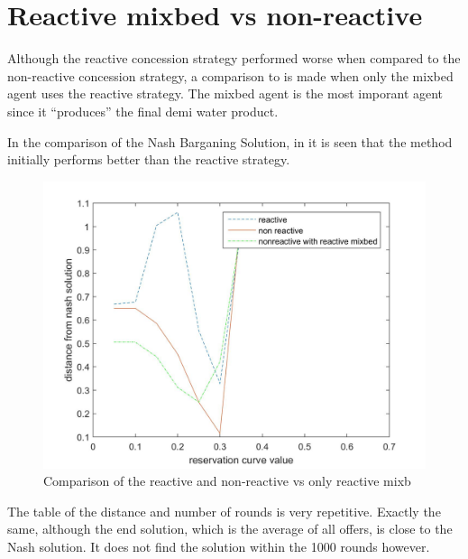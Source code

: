 \section{Reactive mixbed vs non-reactive }
Although the reactive concession strategy performed worse when compared to the non-reactive concession strategy, a comparison to is made when only the mixbed agent uses the reactive strategy. The mixbed agent is the most imporant agent since it ``produces'' the final demi water product.

In the comparison of the Nash Barganing Solution, in  it is seen that the method initially performs better than the reactive strategy. 


\begin{figure}[h]
	\centering
	\includegraphics[width=0.7\linewidth]{img/reactivevsnonreactivevsmixbedrea}
	\caption{Comparison of the reactive and non-reactive vs only reactive mixb}
	\label{fig:reactivevsnon-reactivevsnon-reactivemxbrea}
\end{figure}


The table of the distance and number of rounds is very repetitive. Exactly the same, although the end solution, which is the average of all offers, is close to the Nash solution. It does not find the solution within the 1000 rounds however.

